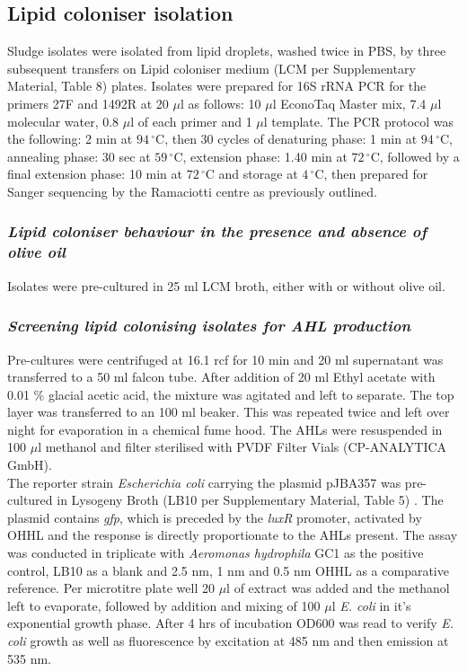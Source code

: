 \documentclass[twoside]{article}
\begin{document}
\subsection{Lipid coloniser isolation}
Sludge isolates  were isolated from lipid droplets, washed twice in PBS, by three subsequent transfers on Lipid coloniser medium (LCM per Supplementary Material, Table 8) plates. Isolates were prepared for 16S rRNA PCR for the primers 27F and 1492R at 20 $\mu$l as follows: 10 $\mu$l EconoTaq Master mix, 7.4 $\mu$l molecular water, 0.8 $\mu$l of each primer and 1 $\mu$l template. The PCR protocol was the following: 2 min at $94\,^{\circ}\mathrm{C}$, then 30 cycles of denaturing phase: 1 min at $94\,^{\circ}\mathrm{C}$, annealing phase: 30 sec at  $59\,^{\circ}\mathrm{C}$, extension phase: 1.40 min at $72\,^{\circ}\mathrm{C}$, followed by a final extension phase: 10 min at $72\,^{\circ}\mathrm{C}$ and storage at $4\,^{\circ}\mathrm{C}$, then prepared for Sanger sequencing by the Ramaciotti centre as previously outlined.

\subsubsection{\emph{Lipid coloniser behaviour in the presence and absence of olive oil}}
Isolates were pre-cultured in 25 ml LCM broth, either with or without olive oil. 

\subsubsection{\emph{Screening lipid colonising isolates for AHL production}}
Pre-cultures were centrifuged at 16.1 rcf for 10 min and 20 ml supernatant was transferred to a 50 ml falcon tube. After addition of 20 ml Ethyl acetate with 0.01 \% glacial acetic acid, the mixture was agitated and left to separate. The top  layer was transferred to an 100 ml beaker. This was repeated twice and left over night for evaporation in a chemical fume hood. The AHLs were resuspended in 100  $\mu$l methanol and filter sterilised with PVDF Filter Vials (CP-ANALYTICA GmbH). \\

 The reporter strain \emph{Escherichia coli} carrying the plasmid pJBA357 was pre-cultured in Lysogeny Broth (LB10 per Supplementary Material, Table 5) \cite{bertani1951studies}. The plasmid contains \emph{gfp}, which  is preceded by the \emph{luxR} promoter, activated by OHHL and the response is directly proportionate to the AHLs present.
The assay was conducted in triplicate with \emph{Aeromonas hydrophila} GC1 as the positive control, LB10 as a blank and 2.5 nm, 1 nm and 0.5 nm OHHL as a comparative reference. Per microtitre plate well 20 $\mu$l of extract was added and the methanol left to evaporate, followed by addition and mixing of 100 $\mu$l \emph{E. coli} in it's exponential growth phase. After 4 hrs of incubation OD600 was read to verify \emph{E. coli} growth as well as fluorescence by excitation at 485 nm and then emission at 535 nm.
\newpage
\end{document}
